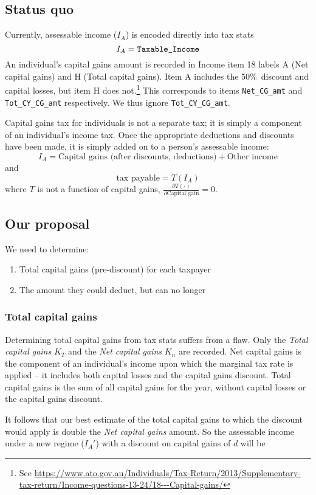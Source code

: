 \documentclass{grattan}\usepackage[]{graphicx}\usepackage[]{color}
\begin{document}
\subsection{Status quo}
Currently, assessable income ($I_A$) is encoded directly into tax stats
\[I_A = \verb=Taxable_Income=\]
An individual's capital gains amount is recorded in Income item 18 labels A (Net capital gains) and H (Total capital gains). Item A includes the 50\%\ discount and capital losses, but item H does not.\footnote{See \url{https://www.ato.gov.au/Individuals/Tax-Return/2013/Supplementary-tax-return/Income-questions-13-24/18---Capital-gains/}} This corresponds to items \verb=Net_CG_amt= and \verb=Tot_CY_CG_amt= respectively. We thus ignore \verb=Tot_CY_CG_amt=.

Capital gains tax for individuals is not a separate tax; it is simply a component of an individual's income tax. Once the appropriate deductions and discounts have been made, it is simply added on to a person's assessable income:
\[I_A = \text{Capital gains (after discounts, deductions)} + \text{Other income}\]
and
\[\text{tax payable} = T(I_A)\]
where $T$ is not a function of capital gains, $\frac{\partial T(\cdot)}{\partial \text{Capital gain}} = 0$.
%
\subsection{Our proposal}
We need to determine:
\begin{enumerate}
\item Total capital gains (pre-discount) for each taxpayer
\item The amount they could deduct, but can no longer
\end{enumerate}
\subsubsection{Total capital gains}
Determining total capital gains from tax stats suffers from a flaw. Only the \emph{Total capital gains} $K_T$ and the \emph{Net capital gains} $K_n$ are recorded. Net capital gains is the component of an individual's income upon which the marginal tax rate is applied -- it includes both capital losses and the capital gains discount. Total capital gains is the sum of all capital gains for the year, without capital losses or the capital gains discount.

It follows that our best estimate of the total capital gains to which the discount would apply is double the \emph{Net capital gains} amount. So the assessable income under a new regime ($I_A'$) with a discount on capital gains of $d$ will be 
\end{document}
